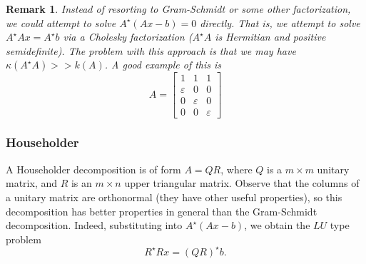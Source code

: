 \documentclass[12pt,reqno]{amsart}
\numberwithin{equation}{section}  %
\newcommand{\ee}{\varepsilon}
\newtheorem*{remark}{Remark}
\begin{document}
\begin{remark}
Instead of resorting to Gram-Schmidt or some other factorization, we could
attempt to solve $ A^{\star}(Ax - b) = 0 $ directly. That is, we attempt to
solve $ A^{\star}Ax = A^{\star}b $ via a Cholesky factorization ($ A^{\star}A$
is Hermitian and positive semidefinite). The problem with this approach is that
we may have $\kappa(A^{\star}A) >> k(A)$. A good example of this is 
\begin{equation*}
A = 
\begin{bmatrix}
 1 & 1 & 1 \\
 \ee & 0 & 0 \\
 0 & \ee & 0 \\
 0 & 0 & \ee 
\end{bmatrix}
\end{equation*}
\end{remark}
\subsubsection{Householder}
A Householder decomposition is of form $A = QR$, where $Q$ is a $m \times m$ unitary matrix, and
$R$ is an $m \times n$ upper triangular matrix. Observe that the columns of a unitary matrix
are orthonormal (they have other useful properties), so this decomposition has better properties
in general than the Gram-Schmidt decomposition. Indeed, substituting into $A^{\star}(Ax-b)$, we 
obtain the $LU$ type problem
\begin{equation*}
R^{\star}R x = (QR)^{\star} b.
\end{equation*}
\end{document}
